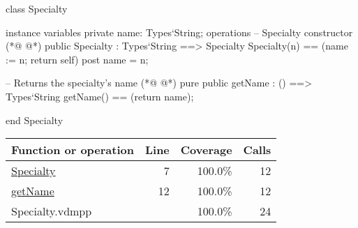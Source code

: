 \begin{vdmpp}[breaklines=true]
class Specialty

instance variables
  private name: Types`String;
operations
 -- Specialty constructor
(*@
\label{Specialty:7}
@*)
 public Specialty : Types`String ==> Specialty
  Specialty(n) == (name := n; return self)
 post name = n;
 
 -- Returns the specialty's name
(*@
\label{getName:12}
@*)
 pure public getName : () ==> Types`String
  getName() == (return name);

end Specialty
\end{vdmpp}
\bigskip
\begin{longtable}{|l|r|r|r|}
\hline
Function or operation & Line & Coverage & Calls \\
\hline
\hline
\hyperref[Specialty:7]{Specialty} & 7&100.0\% & 12 \\
\hline
\hyperref[getName:12]{getName} & 12&100.0\% & 12 \\
\hline
\hline
Specialty.vdmpp & & 100.0\% & 24 \\
\hline
\end{longtable}

